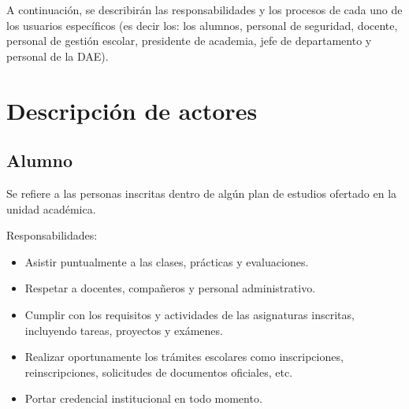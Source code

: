A continuación, se describirán las responsabilidades y los procesos de cada uno de los usuarios específicos (es decir los: los alumnos, personal de seguridad, docente, personal de gestión escolar, presidente de academia, jefe de departamento y personal de la DAE).








\section{Descripción de actores}

\begin{Usuario}{\hypertarget{tAlumno}{\subsection{Alumno}}}{
		Se refiere a las personas inscritas dentro de algún plan de estudios ofertado en la unidad académica.
	}
	\item[Responsabilidades:] \cdtEmpty
	\begin{itemize}
		\item Asistir puntualmente a las clases, prácticas y evaluaciones.
		\item Respetar a docentes, compañeros y personal administrativo.
		\item Cumplir con los requisitos y actividades de las asignaturas inscritas, incluyendo tareas, proyectos y exámenes.
		\item Realizar oportunamente los trámites escolares como inscripciones, reinscripciones, solicitudes de documentos oficiales, etc.
		\item Portar credencial institucional en todo momento.
	\end{itemize}
	

\end{Usuario}


